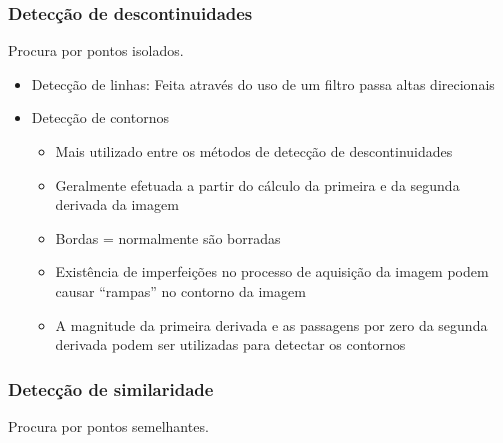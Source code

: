 \documentclass{article}
\begin{document}
\subsubsection{Detecção de descontinuidades}
Procura por pontos isolados.
\begin{itemize}
    \item Detecção de linhas: Feita através do uso de um filtro passa altas direcionais 
    \item Detecção de contornos
    \begin{itemize}
        \item Mais utilizado entre os métodos de detecção de descontinuidades
        \item Geralmente efetuada a partir do cálculo da primeira e da segunda derivada da imagem 
        \item Bordas = normalmente são borradas 
        \item Existência de imperfeições no processo de aquisição da imagem podem causar “rampas” no contorno da imagem 
        \item A magnitude da primeira derivada e as passagens por zero da segunda derivada podem ser utilizadas para detectar os contornos
    \end{itemize}
\end{itemize}

\subsubsection{Detecção de similaridade}
Procura por pontos semelhantes.
\end{document}
